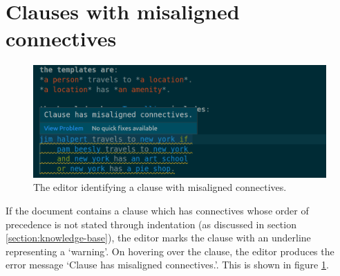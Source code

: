 \documentclass[../main.tex]{subfiles}
\begin{document}
\section{Clauses with misaligned connectives}
\begin{figure}[h!]
\centering
\includegraphics[width = \linewidth]{./figures/misaligned-connectives.png}
\caption{The editor identifying a clause with misaligned connectives.}
\label{fig:misaligned-connectives}
\end{figure}
If the document contains a clause which has connectives whose order of precedence is not stated through indentation (as discussed in section \ref{section:knowledge-base}), the editor marks the clause with an underline representing a `warning'. On hovering over the clause, the editor produces the error message `Clause has misaligned connectives.'. This is shown in figure \ref{fig:misaligned-connectives}.
\end{document}
